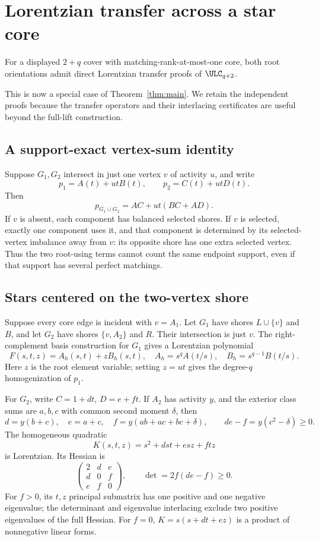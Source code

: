 \section{Lorentzian transfer across a star core}\label{sec:stars}
\begin{theorem}\label{thm:stars}
For a displayed $2+q$ cover with matching-rank-at-most-one core, both root orientations admit direct Lorentzian transfer proofs of $\ULC_{q+2}$.
\end{theorem}
This is now a special case of Theorem~\ref{thm:main}. We retain the independent proofs because the transfer operators and their interlacing certificates are useful beyond the full-lift construction.
\subsection{A support-exact vertex-sum identity}
Suppose $G_1,G_2$ intersect in just one vertex $v$ of activity $u$, and write
\[
 p_1=A(t)+utB(t),\qquad p_2=C(t)+utD(t).
\]
Then
\begin{equation}\label{eq:vertices}
 p_{G_1\cup G_2}=AC+ut(BC+AD).
\end{equation}
If $v$ is absent, each component has balanced selected shores. If $v$ is selected, exactly one component uses it, and that component is determined by its selected-vertex imbalance away from $v$: its opposite shore has one extra selected vertex. Thus the two root-using terms cannot count the same endpoint support, even if that support has several perfect matchings.

\subsection{Stars centered on the two-vertex shore}
Suppose every core edge is incident with $v=A_1$. Let $G_1$ have shores $L\cup\{v\}$ and $B$, and let $G_2$ have shores $\{v,A_2\}$ and $R$. Their intersection is just $v$. The right-complement basis construction for $G_1$ gives a Lorentzian polynomial
\[
 F(s,t,z)=A_h(s,t)+zB_h(s,t),
 \quad A_h=s^qA(t/s),\quad B_h=s^{q-1}B(t/s).
\]
Here $z$ is the root element variable; setting $z=ut$ gives the degree-$q$ homogenization of $p_1$.

For $G_2$, write $C=1+dt$, $D=e+ft$. If $A_2$ has activity $y$, and the exterior class sums are $a,b,c$ with common second moment $\delta$, then
\[
 d=y(b+c),\quad e=a+c,\quad f=y(ab+ac+bc+\delta),
 \qquad de-f=y(c^2-\delta)\ge0.
\]
The homogeneous quadratic
\[
 K(s,t,z)=s^2+dst+esz+ftz
\]
is Lorentzian. Its Hessian is
\[
 \begin{pmatrix}2&d&e\\d&0&f\\e&f&0\end{pmatrix},
 \qquad \det=2f(de-f)\ge0.
\]
For $f>0$, its $t,z$ principal submatrix has one positive and one negative eigenvalue; the determinant and eigenvalue interlacing exclude two positive eigenvalues of the full Hessian. For $f=0$, $K=s(s+dt+ez)$ is a product of nonnegative linear forms.

